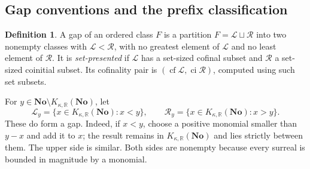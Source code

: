 \documentclass[11pt,letterpaper]{article}
\numberwithin{equation}{section}
\theoremstyle{definition}
\newtheorem{definition}[theorem]{Definition}
\theoremstyle{remark}
\newcommand{\R}{\mathbb R}
\newcommand{\No}{\mathbf{No}}
\newcommand{\cf}{\operatorname{cf}}
\newcommand{\KN}[2]{K_{#1,#2}(\No)}%
\begin{document}
\subsection{Gap conventions and the prefix classification}
\begin{definition}\label{fkc:sb:def:gap}
A gap of an ordered class $F$ is a partition $F=\mathcal L\sqcup\mathcal R$ into two nonempty classes with $\mathcal L<\mathcal R$, with no greatest element of $\mathcal L$ and no least element of $\mathcal R$. It is \emph{set-presented} if $\mathcal L$ has a set-sized cofinal subset and $\mathcal R$ a set-sized coinitial subset. Its cofinality pair is $(\cf\mathcal L,\operatorname{ci}\mathcal R)$, computed using such set subsets.
\end{definition}

For $y\in\No\setminus\KN\kappa\R$, let
\[
 \mathcal L_y=\{x\in\KN\kappa\R:x<y\},\qquad
 \mathcal R_y=\{x\in\KN\kappa\R:x>y\}.
\]
These do form a gap. Indeed, if $x<y$, choose a positive monomial smaller than $y-x$ and add it to $x$; the result remains in $\KN\kappa\R$ and lies strictly between them. The upper side is similar. Both sides are nonempty because every surreal is bounded in magnitude by a monomial.
\end{document}
